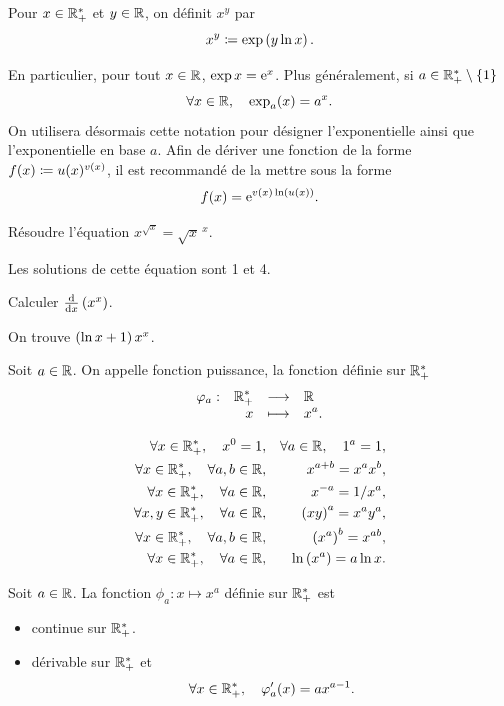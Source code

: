\documentclass{magnoliaold}
\begin{document}
\begin{definition}[utile=-3]
Pour $x\in\mathbb{R}_+^*$ et $y\in\mathbb{R}$, on définit $x^y$ par
\[x^y\coloneqq\exp\left(y \ln x\right).\]
\end{definition}

\begin{remarques}
\remarque En particulier, pour tout $x\in\mathbb{R}$, $\exp x={\rm e}^x$. Plus généralement,
   si $a\in\mathbb{R}_+^*\setminus\left\{1\right\}$
   \[\forall x\in\mathbb{R} ,\quad \exp_a(x)=a^x.\]
   On utilisera désormais cette notation pour désigner l'exponentielle ainsi que
   l'exponentielle en base $a$.
\remarque Afin de dériver une fonction de la forme $f(x)\coloneqq u(x)^{v(x)}$, il est recommandé de la mettre sous la forme
  \[f(x)={\rm e}^{v(x)\ln\left(u(x)\right)}.\]
\end{remarques}

\begin{exos}
\exemple Résoudre l'équation $x^{\sqrt{x}}=\sqrt{x}^{\ x}$.
  \begin{sol}
  Les solutions de cette équation sont 1 et 4.
  \end{sol}
\exemple Calculer $\frac{{\rm d}}{{\rm d}x}\left(x^x\right)$.
  \begin{sol}
  On trouve $\left(\ln x+1\right)x^x$.
  \end{sol}
\end{exos}

\begin{definition}[utile=-3]
Soit $a\in\mathbb{R}$. On appelle fonction puissance, la fonction définie sur $\mathbb{R}_+^*$
\[\begin{array}[t]{lrcl} \displaystyle{\varphi_a} : & \displaystyle{\mathbb{R}_+^*} & \longrightarrow & \displaystyle{\mathbb{R}} \\ & \displaystyle{x} & \longmapsto & \displaystyle{x^a .} \end{array}\]
\end{definition}

\begin{proposition}[utile=-3]
\begin{eqnarray*}
\forall x\in\mathbb{R}_+^* ,\quad x^0=1, & & \forall a\in\mathbb{R} ,\quad 1^a=1,\\
\forall x\in\mathbb{R}_+^* ,\quad \forall a,b\in\mathbb{R}, & & x^{a+b}=x^a x^b,\\
\forall x\in\mathbb{R}_+^* ,\quad \forall a\in\mathbb{R}, & & x^{-a}=1/x^a,\\
\forall x,y\in\mathbb{R}_+^* ,\quad \forall a\in\mathbb{R}, & & \left(xy\right)^a=x^a y^a,\\
\forall x\in\mathbb{R}_+^* ,\quad \forall a,b\in\mathbb{R}, & & \left(x^a\right)^b=x^{ab},\\
\forall x\in\mathbb{R}_+^* ,\quad \forall a\in\mathbb{R}, & & \ln\left(x^a\right)=a\ln x .
\end{eqnarray*}
\end{proposition}

\begin{proposition}[utile=-3]
Soit $a\in\mathbb{R}$. La fonction $\phi_a:x\mapsto x^a$ définie sur $\mathbb{R}_+^*$ est
\begin{itemize}
\item continue sur $\mathbb{R}_+^*$.
\item dérivable sur $\mathbb{R}_+^*$ et
  \[\forall x\in\mathbb{R}_+^* ,\quad \varphi_a'(x)=a x^{a-1}.\]
\end{itemize}
\end{proposition}
\end{document}
